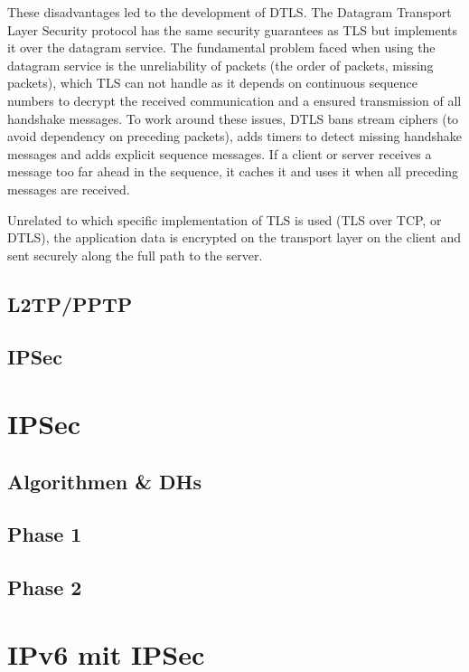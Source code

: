 \documentclass[a4paper]{report}
\begin{document}
These disadvantages led to the development of DTLS. The Datagram Transport Layer Security protocol has the same security guarantees as TLS but implements it over the datagram service. The fundamental problem faced when using the datagram service is the unreliability of packets (the order of packets, missing packets), which TLS can not handle as it depends on continuous sequence numbers to decrypt the received communication and a ensured transmission of all handshake messages. To work around these issues, DTLS bans stream ciphers (to avoid dependency on preceding packets), adds timers to detect missing handshake messages and adds explicit sequence messages. If a client or server receives a message too far ahead in the sequence, it caches it and uses it when all preceding messages are received. \parencite[5-15]{Rescorla2012}

Unrelated to which specific implementation of TLS is used (TLS over TCP, or DTLS), the application data is encrypted on the transport layer on the client and sent securely along the full path to the server.

\subsection{L2TP/PPTP}
\label{ssec:l2tppptp}

\subsection{IPSec}
\label{ssec:IPSec}

\section{IPSec}
\label{sec:IPSec}

\subsection{Algorithmen \& DHs}
\label{ssec:AlgoDH}

\subsection{Phase 1}
\label{ssec:Phase1}

\subsection{Phase 2}
\label{ssec:Phase2}

\section{IPv6 mit IPSec}
\label{sec:IPv6IPSec}
\end{document}
